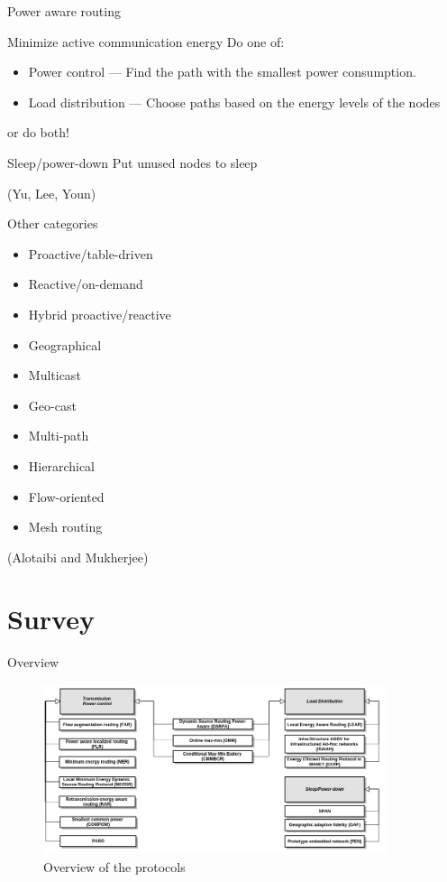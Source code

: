 \documentclass{beamer}
\begin{document}
\begin{frame}{Power aware routing}
\begin{block}{Minimize active communication energy}
    Do one of:
    \begin{itemize}
        \item Power control --- Find the path with the smallest power consumption.
        \item Load distribution --- Choose paths based on the energy levels of the nodes
    \end{itemize}
    or do both!
\end{block}
\begin{block}{Sleep/power-down}
    Put unused nodes to sleep
\end{block}
(Yu, Lee, Youn\cite{main1})
\end{frame}
\begin{frame}{Other categories}
\begin{itemize}
    \item Proactive/table-driven
    \item Reactive/on-demand
    \item Hybrid proactive/reactive
    \item Geographical
    \item Multicast
    \item Geo-cast
    \item Multi-path
    \item Hierarchical
    \item Flow-oriented
    \item Mesh routing
\end{itemize}
    (Alotaibi and Mukherjee\cite{alotaibi2012survey})
\end{frame}

\section{Survey}
\frame{\tableofcontents[currentsection]}
\begin{frame}{Overview}
\begin{figure}
  \centering
  \includegraphics[width=0.9\textwidth]{images/overview}
  \caption{Overview of the protocols}
  
\end{figure}
\end{frame}
\end{document}

